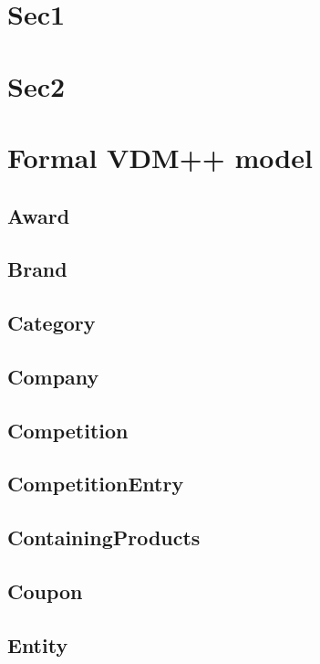 \documentclass{article}
\begin{document}
\section{Sec1}
\section{Sec2}

\pagebreak

\section{Formal VDM++ model}

\subsection{Award}

\subsection{Brand}

\subsection{Category}

\subsection{Company}

\subsection{Competition}

\subsection{CompetitionEntry}

\subsection{ContainingProducts}

\subsection{Coupon}

\subsection{Entity}

\end{document}
